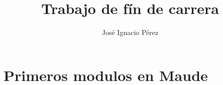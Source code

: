 \documentclass[12pt,a4paper,draft]{book}
\author{Jos\'e Ignacio P\'erez}
\title{Trabajo de f\'in de carrera}
\begin{document}
\newcommand{\codesize}{\small}

\tableofcontents

\chapter{Primeros modulos en Maude}\label{cap.1}

\end{document}
